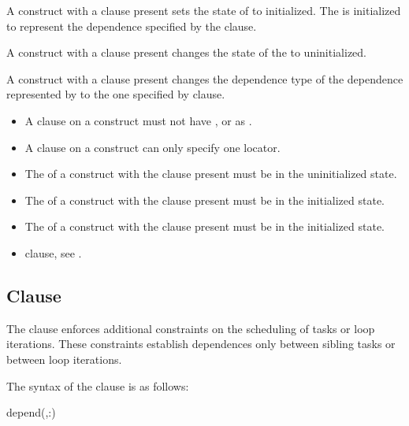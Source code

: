 A  construct with a  clause present sets the state of  to initialized. The  is initialized 
to represent the dependence specified by the  clause.

A  construct with a  clause present changes the state of the  to uninitialized.

A  construct with a  clause present changes the dependence type of the dependence represented by  to the one specified by  clause.

\restrictions
\begin{itemize}
 \item A  clause on a  construct must not have ,  or  as .
 \item A  clause on a  construct can only specify one locator.
 \item The  of a  construct with the  clause present must be in the uninitialized state.
 \item The  of a  construct with the  clause present must be in the initialized state.
 \item The  of a  construct with the  clause present must be in the initialized state.
\end{itemize}

\crossreferences
\begin{itemize}
 \item {} clause, see .
\end{itemize}

\subsection{ Clause}
\label{subsec:depend Clause}
\summary
The  clause enforces additional constraints on the scheduling of tasks or loop iterations.  These
constraints establish dependences only between sibling tasks or between loop iterations.

\syntax
The syntax of the  clause is as follows:

\begin{ompSyntax}
depend(\plc{[depend-modifier},\plc{]dependence-type }:)
\end{ompSyntax}

